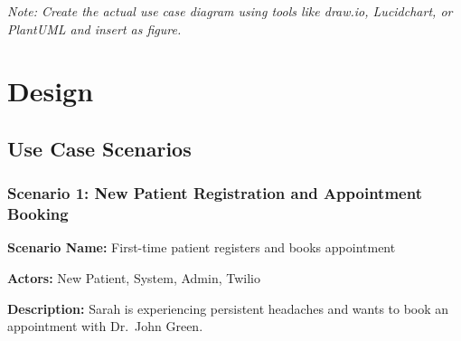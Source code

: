 \documentclass[11pt,a4paper]{article}
\begin{document}
\textit{Note: Create the actual use case diagram using tools like draw.io, Lucidchart, or PlantUML and insert as figure.}

\newpage
\section{Design}

\subsection{Use Case Scenarios}

\subsubsection{Scenario 1: New Patient Registration and Appointment Booking}

\textbf{Scenario Name:} First-time patient registers and books appointment

\textbf{Actors:} New Patient, System, Admin, Twilio

\textbf{Description:} Sarah is experiencing persistent headaches and wants to book an appointment with Dr.\ John Green.
\end{document}
